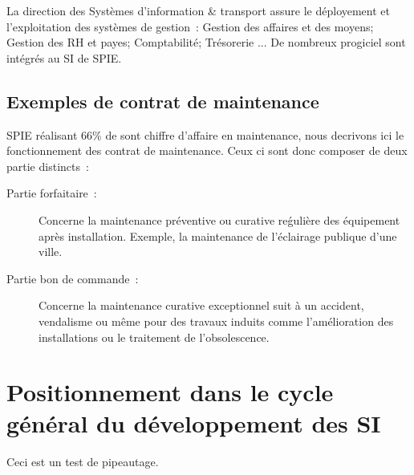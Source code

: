 La direction des Syst\`emes d’information \& transport assure le d\'eployement et l’exploitation des syst\`emes de
gestion~: Gestion des affaires et des moyens; Gestion des RH et payes; Comptabilit\'e; Tr\'esorerie ... De nombreux
progiciel sont int\'egr\'es au SI de SPIE.

\subsection{Exemples de contrat de maintenance}

SPIE r\'ealisant 66\% de sont chiffre d'affaire en maintenance, nous decrivons ici le fonctionnement des contrat de
maintenance. Ceux ci sont donc composer de deux partie distincts~:

\begin{description}
    \item[Partie forfaitaire~:] Concerne la maintenance pr\'eventive ou curative re\'guli\`ere des \'equipement
    apr\`es installation. Exemple, la maintenance de l'\'eclairage publique d'une ville.

    \item[Partie bon de commande~:] Concerne la maintenance curative exceptionnel suit \`a un accident, vendalisme ou
    m\^eme pour des travaux induits comme l'am\'elioration des installations ou le traitement de l’obsolescence.
\end{description}


\section{Positionnement dans le cycle g\'en\'eral du d\'eveloppement des SI}

Ceci est un test de pipeautage.

